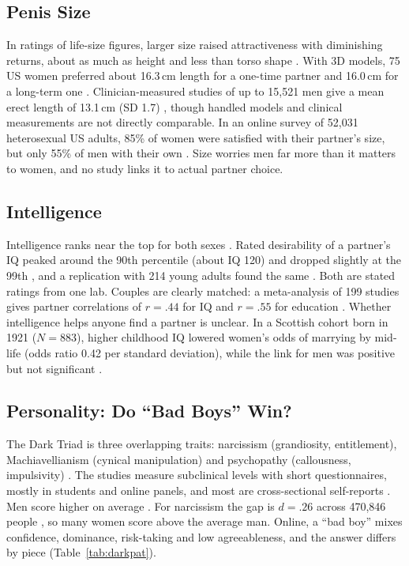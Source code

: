 \documentclass[conference,a4paper]{IEEEtran}
\begin{document}
\subsection{Penis Size}
In ratings of life-size figures, larger size raised attractiveness with diminishing returns, about as much as height and less than torso shape \cite{mautz2013}. With 3D models, 75 US women preferred about 16.3\,cm length for a one-time partner and 16.0\,cm for a long-term one \cite{prause2015}. Clinician-measured studies of up to 15,521 men give a mean erect length of 13.1\,cm (SD 1.7) \cite{veale2015}, though handled models and clinical measurements are not directly comparable. In an online survey of 52,031 heterosexual US adults, 85\% of women were satisfied with their partner's size, but only 55\% of men with their own \cite{lever2006}. Size worries men far more than it matters to women, and no study links it to actual partner choice.

\subsection{Intelligence}
Intelligence ranks near the top for both sexes \cite{buss1989,walter2020}. Rated desirability of a partner's IQ peaked around the 90th percentile (about IQ 120) and dropped slightly at the 99th \cite{gignac2018}, and a replication with 214 young adults found the same \cite{gignac2019}. Both are stated ratings from one lab. Couples are clearly matched: a meta-analysis of 199 studies gives partner correlations of $r=.44$ for IQ and $r=.55$ for education \cite{horwitz2023}. Whether intelligence helps anyone find a partner is unclear. In a Scottish cohort born in 1921 ($N=883$), higher childhood IQ lowered women's odds of marrying by mid-life (odds ratio 0.42 per standard deviation), while the link for men was positive but not significant \cite{taylor2005}.

\subsection{Personality: Do ``Bad Boys'' Win?}
\label{sec:darktriad}
The Dark Triad is three overlapping traits: narcissism (grandiosity, entitlement), Machiavellianism (cynical manipulation) and psychopathy (callousness, impulsivity) \cite{paulhus2002}. The studies measure subclinical levels with short questionnaires, mostly in students and online panels, and most are cross-sectional self-reports \cite{muris2017}. Men score higher on average \cite{muris2017}. For narcissism the gap is $d=.26$ across 470,846 people \cite{grijalva2015}, so many women score above the average man. Online, a ``bad boy'' mixes confidence, dominance, risk-taking and low agreeableness, and the answer differs by piece (Table~\ref{tab:darkpat}).
\end{document}
